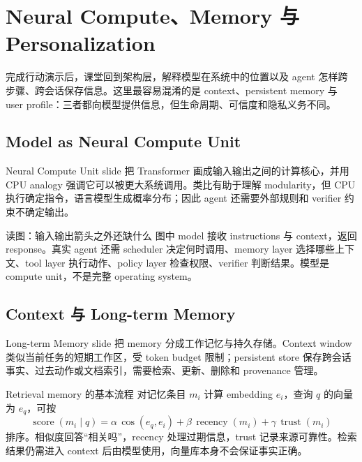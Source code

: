 \section{Neural Compute、Memory 与 Personalization}

完成行动演示后，课堂回到架构层，解释模型在系统中的位置以及 agent 怎样跨步骤、跨会话保存信息。这里最容易混淆的是 context、persistent memory 与 user profile：三者都向模型提供信息，但生命周期、可信度和隐私义务不同。

\subsection{Model as Neural Compute Unit}

Neural Compute Unit slide 把 Transformer 画成输入输出之间的计算核心，并用 CPU analogy 强调它可以被更大系统调用。类比有助于理解 modularity，但 CPU 执行确定指令，语言模型生成概率分布；因此 agent 还需要外部规则和 verifier 约束不确定输出。


\begin{knowledgebox}{读图：输入输出箭头之外还缺什么}
图中 model 接收 instructions 与 context，返回 response。真实 agent 还需 scheduler 决定何时调用、memory layer 选择哪些上下文、tool layer 执行动作、policy layer 检查权限、verifier 判断结果。模型是 compute unit，不是完整 operating system。
\end{knowledgebox}


\subsection{Context 与 Long-term Memory}

Long-term Memory slide 把 memory 分成工作记忆与持久存储。Context window 类似当前任务的短期工作区，受 token budget 限制；persistent store 保存跨会话事实、过去动作或文档索引，需要检索、更新、删除和 provenance 管理。


\begin{importantbox}{Retrieval memory 的基本流程}
对记忆条目 $m_i$ 计算 embedding $e_i$，查询 $q$ 的向量为 $e_q$，可按
\[
\operatorname{score}(m_i\mid q)
=\alpha\,\cos(e_q,e_i)
+\beta\,\operatorname{recency}(m_i)
+\gamma\,\operatorname{trust}(m_i)
\]
排序。相似度回答“相关吗”，recency 处理过期信息，trust 记录来源可靠性。检索结果仍需进入 context 后由模型使用，向量库本身不会保证事实正确。
\end{importantbox}


